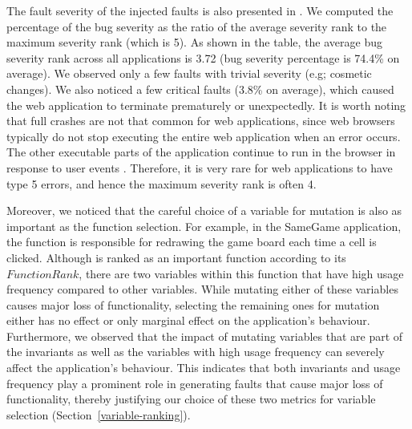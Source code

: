  The fault severity of the injected faults
is also presented in . We computed the percentage of the bug severity as the ratio of the average severity rank to the maximum severity rank (which is 5). As shown in the table, the average bug severity rank across all applications is 3.72 (bug severity percentage is 74.4\% on average).
%
%
We observed only a few faults with trivial severity (e.g; cosmetic changes).
We also noticed a few critical faults (3.8\% on average), which caused the web application to terminate prematurely or unexpectedly.
It is worth noting that full crashes are not that common for web applications, since web browsers typically do not stop executing the entire web application when an error occurs. The other executable parts of the application continue to run in the browser in response to user events \cite{Ocariza-2011}. 
Therefore, it is very rare for web applications to have type 5 errors, and hence the maximum severity rank is often 4.


Moreover, we noticed that the careful choice of a variable for mutation is also as important as the function selection. For example, in the SameGame
application, the  function is responsible for redrawing the game board each time a cell is clicked. Although 
is ranked as an important function according to its $FunctionRank$, there are two variables within this function that have
high usage frequency compared to other variables. While mutating either of these variables causes major loss of functionality, 
selecting the remaining ones for mutation either has no effect or only marginal effect on the application's behaviour.
Furthermore, we observed that the impact of mutating variables that are part of the invariants as well as the variables 
with high usage frequency can severely affect the application's behaviour. This indicates that both invariants and usage
frequency play a prominent role in generating faults that cause major loss of functionality, thereby justifying our choice
of these two metrics for variable selection (Section~\ref{variable-ranking}).   
%


